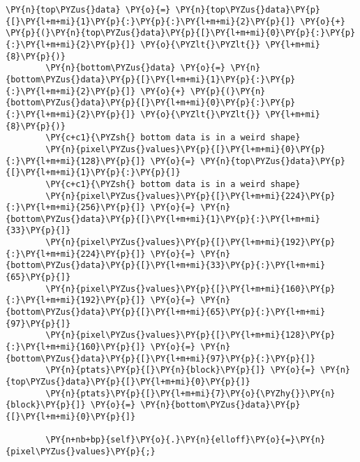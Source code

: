 \begin{tcolorbox}[breakable, size=fbox, boxrule=1pt, pad at break*=1mm,colback=cellbackground, colframe=cellborder]
\begin{Verbatim}[commandchars=\\\{\}]
		\PY{n}{top\PYZus{}data} \PY{o}{=} \PY{n}{top\PYZus{}data}\PY{p}{[}\PY{l+m+mi}{1}\PY{p}{:}\PY{p}{:}\PY{l+m+mi}{2}\PY{p}{]} \PY{o}{+} \PY{p}{(}\PY{n}{top\PYZus{}data}\PY{p}{[}\PY{l+m+mi}{0}\PY{p}{:}\PY{p}{:}\PY{l+m+mi}{2}\PY{p}{]} \PY{o}{\PYZlt{}\PYZlt{}} \PY{l+m+mi}{8}\PY{p}{)}
		\PY{n}{bottom\PYZus{}data} \PY{o}{=} \PY{n}{bottom\PYZus{}data}\PY{p}{[}\PY{l+m+mi}{1}\PY{p}{:}\PY{p}{:}\PY{l+m+mi}{2}\PY{p}{]} \PY{o}{+} \PY{p}{(}\PY{n}{bottom\PYZus{}data}\PY{p}{[}\PY{l+m+mi}{0}\PY{p}{:}\PY{p}{:}\PY{l+m+mi}{2}\PY{p}{]} \PY{o}{\PYZlt{}\PYZlt{}} \PY{l+m+mi}{8}\PY{p}{)}
        \PY{c+c1}{\PYZsh{} bottom data is in a weird shape}
		\PY{n}{pixel\PYZus{}values}\PY{p}{[}\PY{l+m+mi}{0}\PY{p}{:}\PY{l+m+mi}{128}\PY{p}{]} \PY{o}{=} \PY{n}{top\PYZus{}data}\PY{p}{[}\PY{l+m+mi}{1}\PY{p}{:}\PY{p}{]}
		\PY{c+c1}{\PYZsh{} bottom data is in a weird shape}
		\PY{n}{pixel\PYZus{}values}\PY{p}{[}\PY{l+m+mi}{224}\PY{p}{:}\PY{l+m+mi}{256}\PY{p}{]} \PY{o}{=} \PY{n}{bottom\PYZus{}data}\PY{p}{[}\PY{l+m+mi}{1}\PY{p}{:}\PY{l+m+mi}{33}\PY{p}{]}
		\PY{n}{pixel\PYZus{}values}\PY{p}{[}\PY{l+m+mi}{192}\PY{p}{:}\PY{l+m+mi}{224}\PY{p}{]} \PY{o}{=} \PY{n}{bottom\PYZus{}data}\PY{p}{[}\PY{l+m+mi}{33}\PY{p}{:}\PY{l+m+mi}{65}\PY{p}{]}
		\PY{n}{pixel\PYZus{}values}\PY{p}{[}\PY{l+m+mi}{160}\PY{p}{:}\PY{l+m+mi}{192}\PY{p}{]} \PY{o}{=} \PY{n}{bottom\PYZus{}data}\PY{p}{[}\PY{l+m+mi}{65}\PY{p}{:}\PY{l+m+mi}{97}\PY{p}{]}
		\PY{n}{pixel\PYZus{}values}\PY{p}{[}\PY{l+m+mi}{128}\PY{p}{:}\PY{l+m+mi}{160}\PY{p}{]} \PY{o}{=} \PY{n}{bottom\PYZus{}data}\PY{p}{[}\PY{l+m+mi}{97}\PY{p}{:}\PY{p}{]}
		\PY{n}{ptats}\PY{p}{[}\PY{n}{block}\PY{p}{]} \PY{o}{=} \PY{n}{top\PYZus{}data}\PY{p}{[}\PY{l+m+mi}{0}\PY{p}{]}
		\PY{n}{ptats}\PY{p}{[}\PY{l+m+mi}{7}\PY{o}{\PYZhy{}}\PY{n}{block}\PY{p}{]} \PY{o}{=} \PY{n}{bottom\PYZus{}data}\PY{p}{[}\PY{l+m+mi}{0}\PY{p}{]}

        \PY{n+nb+bp}{self}\PY{o}{.}\PY{n}{elloff}\PY{o}{=}\PY{n}{pixel\PYZus{}values}\PY{p}{;}



\end{Verbatim}
\end{tcolorbox}
